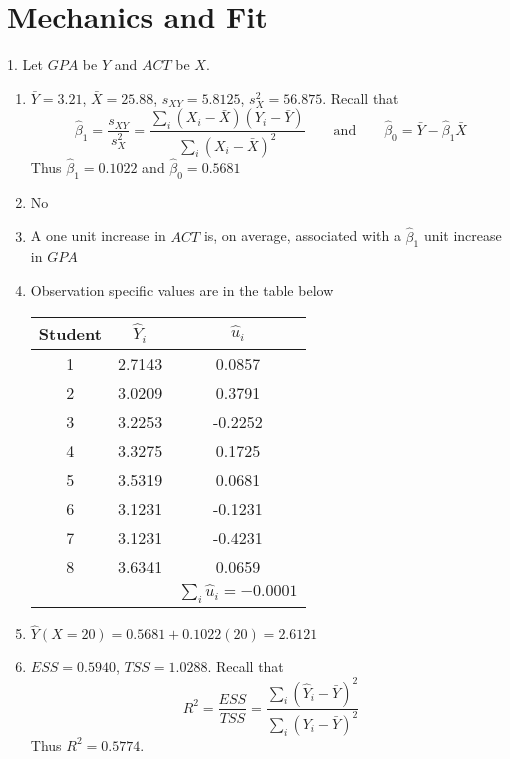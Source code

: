\documentclass[12pt]{article}
\begin{document}
\section{Mechanics and Fit}

1. Let $GPA$ be $Y$ and $ACT$ be $X$.
\begin{enumerate}
  \item $\bar Y=3.21$, $\bar X=25.88$, $s_{XY}=5.8125$, $s_X^2=56.875$. 
  Recall that 
  \begin{equation}\label{OLS}
    \hat\beta_1=\frac{s_{XY}}{s_X^2}=\frac{\sum_i(X_i-\bar X)(Y_i-\bar Y)}{\sum_i(X_i-\bar X)^2}
    \qquad\text{and}\qquad
    \hat\beta_0=\bar Y-\hat\beta_1\bar X
  \end{equation}
  Thus $\hat\beta_1=0.1022$ and $\hat\beta_0=0.5681$
  
  \item No
  
  \item A one unit increase in $ACT$ is, on average, associated with a $\hat\beta_1$ unit increase in $GPA$
  
  \item Observation specific values are in the table below
  \begin{center}
    \begin{tabular}{ccc}
    \toprule
    Student & $\hat Y_i$ & $\hat u_i$ \\
    \midrule
    1     & 2.7143 & 0.0857 \\
    2     & 3.0209 & 0.3791 \\
    3     & 3.2253 & -0.2252 \\
    4     & 3.3275 & 0.1725 \\
    5     & 3.5319 & 0.0681 \\
    6     & 3.1231 & -0.1231 \\
    7     & 3.1231 & -0.4231 \\
    8     & 3.6341 & 0.0659 \\
    \midrule
          &       & {$\sum_i \hat u_i=-0.0001$} \\
    \bottomrule
    \end{tabular}%
  \end{center}
  
  \item $\hat Y(X=20)=0.5681+0.1022(20)=2.6121$
  
  \item $ESS=0.5940$, $TSS=1.0288$. Recall that 
  \begin{equation*}
    R^2=\frac{ESS}{TSS}=\frac{\sum_i(\hat Y_i-\bar Y)^2}{\sum_i(Y_i-\bar Y)^2}
  \end{equation*}
  Thus $R^2=0.5774$.
\end{enumerate}
\end{document}
